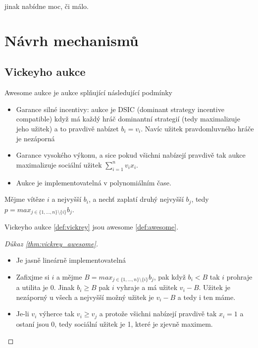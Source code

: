  jinak nabídne moc, či málo.\section{Návrh mechanismů}
\subsection{Vickeyho aukce}
\begin{definition}
\label{def:awesome}
  Awesome aukce je aukce splňující následující podmínky 
  \begin{itemize}
        \item Garance silné incentivy: aukce je DSIC (dominant strategy incentive compatible) když má každý hráč dominantní strategií (tedy maximalizuje jeho užitek) a to pravdivě nabízet $b_i = v_i$. 
        Navíc užitek pravdomluvného hráče je nezáporná
        \item Garance vysokého výkonu, a sice pokud všichni nabízejí pravdivě tak aukce maximalizuje sociální užitek $\sum^n_{i=1} v_ix_i$. 
        \item Aukce je implementovatelná v polynomiálním čase. 
  \end{itemize}
\end{definition}
\begin{definition}
\label{def:vickrey}
    Mějme vítěze $i$ a nejvyšší $b_i$, a nechť zaplatí druhý nejvyšší $b_j$, tedy $p = max_{j \in \{1,\dots,n\} \setminus \{i\}} b_j$. 
\end{definition}
\begin{theorem}
\label{thm:vickrey_awesome}
    Vickeyho aukce \ref{def:vickrey} jsou awesome \ref{def:awesome}. 
\end{theorem}
\begin{proof}[Důkaz \ref{thm:vickrey_awesome}]
    \begin{itemize} 
        \item Je jasně lineárně implementovatelná 
        \item Zafixjme si $i$ a mějme $B = max_{j \in \{1,\dots,n\} \setminus \{i\}} b_j$, pak když $b_i < B$ tak $i$ prohraje a utilita je $0$. 
            Jinak $b_i \geq B$ pak $i$ vyhraje a má užitek $v_i -B$. 
            Užitek je nezáporný u všech a nejvyšší možný užitek je $v_i -B$ a tedy i ten máme. 
        \item Je-li $v_i$ výherce tak $v_i \geq v_j$ a protože všichni nabízejí pravdivě tak $x_i = 1$ a ostaní jsou $0$, tedy sociální užitek je 1, které je zjevně maximem. 
    \end{itemize}
\end{proof}
